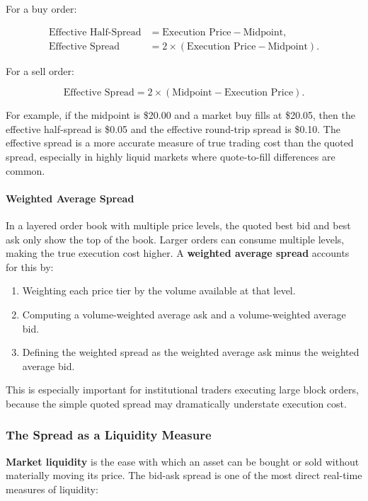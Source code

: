 \documentclass[12pt,openany]{book}
\begin{document}
For a buy order:

\begin{align*}
    \text{Effective Half-Spread} &= \text{Execution Price} - \text{Midpoint}, \\
    \text{Effective Spread} &= 2 \times (\text{Execution Price} - \text{Midpoint}).
\end{align*}

For a sell order:

\begin{equation*}
    \text{Effective Spread} = 2 \times (\text{Midpoint} - \text{Execution Price}).
\end{equation*}

For example, if the midpoint is \$20.00 and a market buy fills at \$20.05, then the effective half-spread is \$0.05 and the effective round-trip spread is \$0.10. The effective spread is a more accurate measure of true trading cost than the quoted spread, especially in highly liquid markets where quote-to-fill differences are common.

\paragraph{Weighted Average Spread}
In a layered order book with multiple price levels, the quoted best bid and best ask only show the top of the book. Larger orders can consume multiple levels, making the true execution cost higher. A \textbf{weighted average spread} accounts for this by:

\begin{enumerate}[leftmargin=*]
    \item Weighting each price tier by the volume available at that level.
    \item Computing a volume-weighted average ask and a volume-weighted average bid.
    \item Defining the weighted spread as the weighted average ask minus the weighted average bid.
\end{enumerate}

This is especially important for institutional traders executing large block orders, because the simple quoted spread may dramatically understate execution cost.

\subsubsection{The Spread as a Liquidity Measure}
\textbf{Market liquidity} is the ease with which an asset can be bought or sold without materially moving its price. The bid-ask spread is one of the most direct real-time measures of liquidity:
\end{document}
